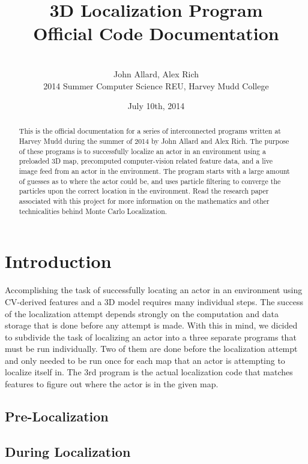 \documentclass[a4paper,11pt]{article}
\title{3D Localization Program \\ Official Code Documentation}
\author{ \\[7in]  John Allard, Alex Rich \\ 2014 Summer Computer Science REU, Harvey Mudd College}
\date{July 10th, 2014}
\begin{document}
  \maketitle
  \newpage

    \tableofcontents
    \newpage

  \begin{abstract}
  This is the official documentation for a series of interconnected programs written at Harvey Mudd during the summer of 2014 by John Allard and Alex Rich. The purpose of these programs is to successfully localize an actor in an environment using a preloaded 3D map, precomputed computer-vision related feature data, and a live image feed from an actor in the environment. The program starts with a large amount of guesses as to where the actor could be, and uses particle filtering to converge the particles upon the correct location in the environment. Read the research paper associated with this project for more information on the mathematics and other technicalities behind Monte Carlo Localization.
  \end{abstract}

  \section{Introduction}
  Accomplishing the task of successfully locating an actor in an environment using CV-derived features and a 3D model requires many individual steps. The success of the localization attempt depends strongly on the computation and data storage that is done before any attempt is made. With this in mind, we dicided to subdivide the task of localizing an actor into a three separate programs that must be run individually. Two of them are done before the localization attempt and only needed to be run once for each map that an actor is attempting to localize itself in. The 3rd program is the actual localization code that matches features to figure out where the actor is in the given map.

  \subsection{Pre-Localization}
  \begin{enumerate}
  
  \end{enumerate}
  
  \subsection{During Localization}
  
  
\end{document}

